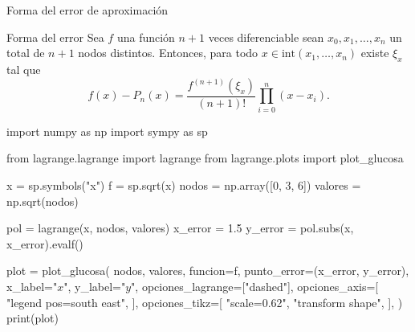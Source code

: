 \begin{frame}[fragile]{Forma del error de aproximación}
  \begin{exampleblock}{Forma del error}
    Sea $f$ una función $n + 1$ veces diferenciable sean
    $x_0, x_1, \ldots, x_n$ un total de $n + 1$ nodos distintos.
    Entonces, para todo $x \in \text{int}(x_1, \ldots, x_n)$ existe $\xi_x$
    tal que
    \[
      f(x) - P_n(x) = \frac{f^{(n + 1)}(\xi_x)}{(n + 1)!}
      \prod_{i = 0}^n (x - x_i).
    \]
  \end{exampleblock}

  \begin{center}
    \begin{pycode}
      import numpy as np
      import sympy as sp
      
      from lagrange.lagrange import lagrange
      from lagrange.plots import plot_glucosa
  
      x = sp.symbols("x")
      f = sp.sqrt(x)
      nodos = np.array([0, 3, 6])
      valores = np.sqrt(nodos)

      pol = lagrange(x, nodos, valores)
      x_error = 1.5
      y_error = pol.subs(x, x_error).evalf()

  
      plot = plot_glucosa(
        nodos,
        valores,
        funcion=f,
        punto_error=(x_error, y_error),
        x_label="$x$",
        y_label="$y$",
        opciones_lagrange=["dashed"],
        opciones_axis=[
          "legend pos=south east",
        ],
        opciones_tikz=[
          "scale=0.62",
          "transform shape",
        ],
      )
      print(plot)
    \end{pycode}
  \end{center}
\end{frame}
